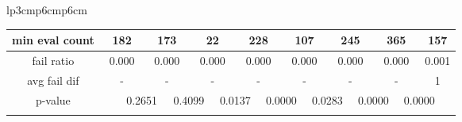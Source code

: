 {\begin{tabular}{lp{3cm}p{6cm}p{6cm}}
\begin{tabular}[h]{m{2.5cm}m{}m{}m{}m{}m{}m{}m{}m{}m{}m{}m{}m{}m{}m{}m{}m{}}
\multicolumn{1}{c}{min eval count}&\multicolumn{2}{c}{         182}&\multicolumn{2}{c}{       173}&\multicolumn{2}{c}{        22}&\multicolumn{2}{c}{       228}&\multicolumn{2}{c}{       107}&\multicolumn{2}{c}{       245}&\multicolumn{2}{c}{       365}&\multicolumn{2}{c}{       157}\\
\hline
\multicolumn{1}{c}{fail ratio}&\multicolumn{2}{c}{           0.000}&\multicolumn{2}{c}{     0.000}&\multicolumn{2}{c}{     0.000}&\multicolumn{2}{c}{     0.000}&\multicolumn{2}{c}{     0.000}&\multicolumn{2}{c}{     0.000}&\multicolumn{2}{c}{     0.000}&\multicolumn{2}{c}{     0.001}\\
\multicolumn{1}{c}{avg fail dif}&\multicolumn{2}{c}{             -}&\multicolumn{2}{c}{         -}&\multicolumn{2}{c}{         -}&\multicolumn{2}{c}{         -}&\multicolumn{2}{c}{         -}&\multicolumn{2}{c}{         -}&\multicolumn{2}{c}{         -}&\multicolumn{2}{c}{         1}\\
\hline
\multicolumn{1}{c}{p-value}&&\multicolumn{2}{c}{0.2651}&\multicolumn{2}{c}{0.4099}&\multicolumn{2}{c}{0.0137}&\multicolumn{2}{c}{0.0000}&\multicolumn{2}{c}{0.0283}&\multicolumn{2}{c}{0.0000}&\multicolumn{2}{c}{0.0000}\\
&&&&&&&&&&&&&&&&\end{tabular}
\end{tabular}
}

